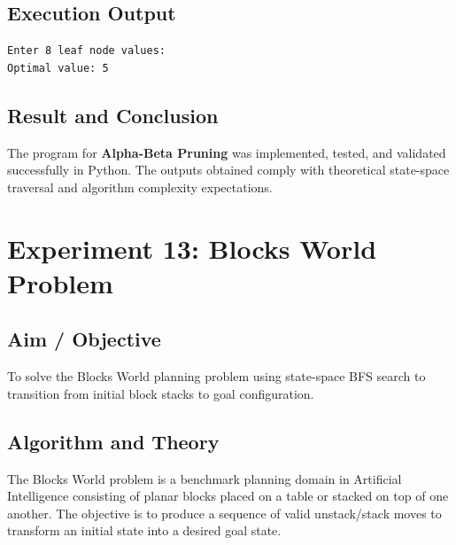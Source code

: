 \documentclass[11pt,a4paper]{report}
\begin{document}
\section{Execution Output}
\begin{tcolorbox}[colback=outputback,colframe=outputframe,title={\textbf{Terminal Output - Alpha-Beta Pruning}}]
\begin{verbatim}
Enter 8 leaf node values: 
Optimal value: 5
\end{verbatim}
\end{tcolorbox}

\section{Result and Conclusion}
The program for \textbf{Alpha-Beta Pruning} was implemented, tested, and validated successfully in Python. The outputs obtained comply with theoretical state-space traversal and algorithm complexity expectations.

\newpage

\chapter{Experiment 13: Blocks World Problem}

\section{Aim / Objective}
To solve the Blocks World planning problem using state-space BFS search to transition from initial block stacks to goal configuration.

\section{Algorithm and Theory}
The Blocks World problem is a benchmark planning domain in Artificial Intelligence consisting of planar blocks placed on a table or stacked on top of one another. The objective is to produce a sequence of valid unstack/stack moves to transform an initial state into a desired goal state.
\end{document}
